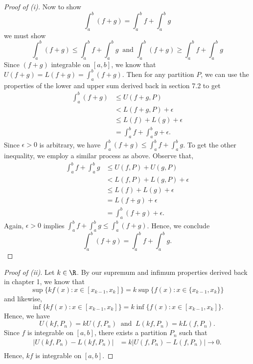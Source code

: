 \begin{proof}[Proof of (i)]
	Now to show 
	\[  \int_{ a }^{ b } (f+g)  = \int_{ a }^{ b } f + \int_{ a }^{ b } g \]
	we must show 
	\[  \int_{ a }^{ b } (f+g) \leq \int_{ a }^{ b } f + \int_{ a }^{ b } g \ \text{ and } \int_{ a }^{ b } (f+g) \geq \int_{ a }^{ b } f + \int_{ a }^{ b } g  \]
	Since \( (f+g)  \) integrable on \( [a,b] \), we know that \( U(f+g) = L(f+g) = \int_{ a }^{ b } (f+g)  \). Then for any partition \( P  \), we can use the properties of the lower and upper sum derived back in section 7.2 to get 
	\begin{align*}
	    \int_{ a }^{ b } (f+g)  &\leq U(f+g, P) \\
								&< L(f+g, P) + \epsilon \\
								&\leq L(f) + L(g) + \epsilon \\
								&= \int_{ a }^{ b } f  + \int_{ a }^{ b } g + \epsilon.
	\end{align*}
	Since \( \epsilon > 0   \) is arbitrary, we have \( \int_{ a }^{ b } (f+g)  \leq \int_{ a }^{ b } f + \int_{ a }^{ b } g  \). To get the other inequality, we employ a similar process as above. Observe that, 
	\begin{align*}
	    \int_{ a }^{ b } f + \int_{ a }^{ b } g &\leq U(f,P) + U(g, P)\\
												&< L(f,P) + L(g,P) + \epsilon \\
												&\leq L(f) + L(g) + \epsilon \\
												&= L(f+g) + \epsilon \\
												&= \int_{ a }^{ b } (f+g) + \epsilon.
	\end{align*}
	Again, \( \epsilon > 0    \) implies \( \int_{ a }^{ b } f + \int_{ a }^{ b }  g \leq \int_{ a }^{ b } (f+g) \). Hence, we conclude
	\[  \int_{ a }^{ b } (f+g) = \int_{ a }^{ b } f + \int_{ a }^{ b } g. \]
	
\end{proof}

\begin{proof}[Proof of (ii)]
	Let \( k \in \R  \). By our supremum and infimum properties derived back in chapter 1, we know that 
	\[  \sup \{ k f(x) : x \in [x_{k-1}, x_{k }]  \} = k \sup \{ f(x) : x \in \{ x_{k-1}, x_{k} \}  \}   \]
	and likewise, 
	\[  \inf \{ kf(x) : x \in [x_{k-1}, x_{k}] \} = k \inf \{ f(x) : x  \in [x_{k-1}, x_{k }]  \}.  \]
	Hence, we have
	\[  U(kf, P_{n}) = k U(f, P_{n}) \ \text{ and } \ L(kf, P_{n}) = k L(f, P_{n}).  \]
	Since \( f  \) is integrable on \( [a,b]  \), there exists a partition \( P_{n} \) such that 
	\begin{align*}
	    | U(kf, P_{n}) - L(kf, P_{n}) | &= k | U(f, P_{n}) - L(f, P_{n}) | \to 0.  \\
	\end{align*}
	Hence, \( kf  \) is integrable on \( [a,b] \).

\end{proof}

